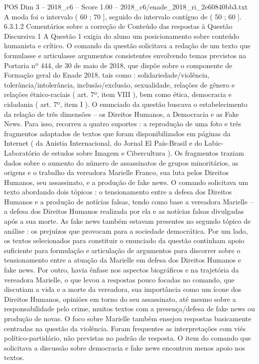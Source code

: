 \begin{textsample}{POS Dim 3 – 2018\_c6 – Score 1.00 – 2018\_c6/enade\_2018\_ri\_2e60840bb3.txt}
A moda foi o intervalo ( 60 ; 70 ], seguido do intervalo contíguo de ( 50 ; 60 ]. 6.3.1.2 Comentários sobre a correção de Conteúdo das respostas à Questão Discursiva 1 A Questão 1 exigia do aluno um posicionamento sobre conteúdo humanista e crítico.
O comando da questão solicitava a redação de um texto que formulasse e articulasse argumentos consistentes envolvendo temas previstos na Portaria nº 444, de 30 de maio de 2018, que dispõe sobre o componente de Formação geral do Enade 2018, tais como : solidariedade/violência, tolerância/intolerância, inclusão/exclusão, sexualidade, relações de gênero e relações étnico-raciais ( art. 7º, item VIII ), bem como ética, democracia e cidadania ( art. 7º, item I ).
O enunciado da questão buscava o estabelecimento da relação de três dimensões – os Direitos Humanos, a Democracia e as Fake News.
Para isso, recorreu a quatro suportes : a reprodução de uma foto e três fragmentos adaptados de textos que foram disponibilizados em páginas da Internet ( da Anistia Internacional, do Jornal El País-Brasil e do Labic-Laboratório de estudos sobre Imagem e Cibercultura ).
Os fragmentos traziam dados sobre o aumento do número de assassinatos de grupos minoritários, as origens e o trabalho da vereadora Marielle Franco, sua luta pelos Direitos Humanos, seu assassinato, e a produção de fake news.
O comando solicitava um texto abordando dois tópicos : o tensionamento entre a defesa dos Direitos Humanos e a produção de notícias falsas, tendo como base a vereadora Marielle – a defesa dos Direitos Humanos realizada por ela e as notícias falsas divulgadas após a sua morte.
As fake news também estavam presentes no segundo tópico de análise : os prejuízos que provocam para a sociedade democrática.
Por um lado, os textos selecionados para constituir o enunciado da questão continham apoio suficiente para formulação e articulação de argumentos para discorrer sobre o tensionamento entre a atuação da Marielle em defesa dos Direitos Humanos e fake news.
Por outro, havia ênfase nos aspectos biográficos e na trajetória da vereadora Marielle, o que levou a respostas pouco focadas no comando, que discutiam a vida e a morte da vereadora, sua importância como um ícone dos Direitos Humanos, opiniões em torno do seu assassinato, até mesmo sobre a responsabilidade pelo crime, muitos textos com a presença/defesa de fake news ou produção de novas.
O foco sobre Marielle também ensejou respostas basicamente centradas na questão da violência.
Foram frequentes as interpretações com viés político-partidário, não previstas no padrão de resposta.
O item do comando que solicitava a discussão sobre democracia e fake news encontrou menos apoio nos textos.

\end{textsample}
